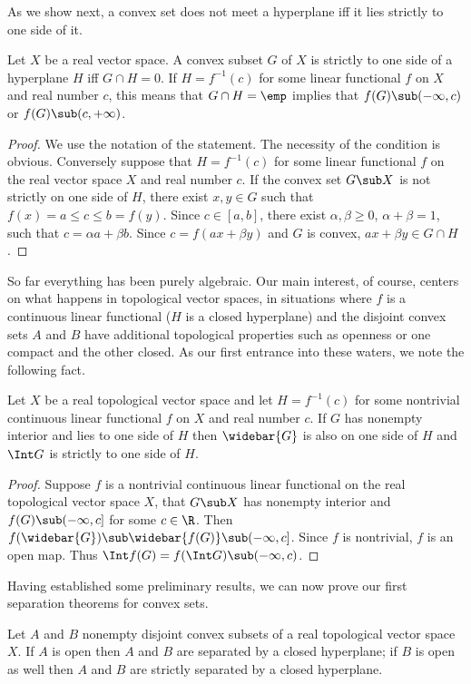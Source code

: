 As we show next, a convex set does not meet a hyperplane iff it lies strictly to one side of it.
\begin{proposition}
Let $X$ be a real vector space. A convex subset $G$ of $X$ is strictly to one side of a hyperplane $H$ iff $G\cap H=0$. If $H=f^{-1}(c)$ for some linear functional $f$ on $X$ and real number $c$, this means that $G\cap H=\emp$ implies that $f(G)\sub(-\infty,c)$ or $f(G)\sub(c,+\infty)$.
\end{proposition}
\begin{proof}
We use the notation of the statement. The necessity of the condition is obvious. Conversely suppose that $H=f^{-1}(c)$ for some linear functional $f$ on the real vector space $X$ and real number $c$. If the convex set $G\sub X$ is not strictly on one side of $H$, there exist $x,y\in G$ such that $f(x)=a\leq c\leq b=f(y)$. Since $c\in [a,b]$, there exist $\alpha,\beta\geq 0$, $\alpha+\beta=1$, such that $c=\alpha a+\beta b$. Since $c=f (ax+\beta y)$ and $G$ is convex, $ax+\beta y\in G\cap H$.
\end{proof}
So far everything has been purely algebraic. Our main interest, of course, centers on what happens in topological vector spaces, in situations where $f$ is a continuous linear functional ($H$ is a closed hyperplane) and the disjoint convex sets $A$ and $B$ have additional topological properties such as openness or one compact and the other closed. As our first entrance into these waters, we note the following fact.
\begin{proposition}\label{TVS closed hyperplane separation}
Let $X$ be a real topological vector space and let $H=f^{-1}(c)$ for some nontrivial continuous linear functional $f$ on $X$ and real number $c$. If $G$ has nonempty interior and lies to one side of $H$ then $\widebar{G}$ is also on one side of $H$ and $\Int G$ is strictly to one side of $H$.
\end{proposition}
\begin{proof}
Suppose $f$ is a nontrivial continuous linear functional on the real topological vector space $X$, that $G\sub X$ has nonempty interior and $f(G)\sub(-\infty,c]$ for some $c\in\R$. Then $f(\widebar{G})\sub\widebar{f(G)}\sub(-\infty,c]$. Since $f$ is nontrivial, $f$ is an open map. Thus $\Int f(G)=f(\Int G)\sub(-\infty,c)$.
\end{proof}
Having established some preliminary results, we can now prove our first separation theorems for convex sets.
\begin{theorem}\label{TVS separation of convex sets}
Let $A$ and $B$ nonempty disjoint convex subsets of a real topological vector space $X$. If $A$ is open then $A$ and $B$ are separated by a closed hyperplane; if $B$ is open as well then $A$ and $B$ are strictly separated by a closed hyperplane.
\end{theorem}
